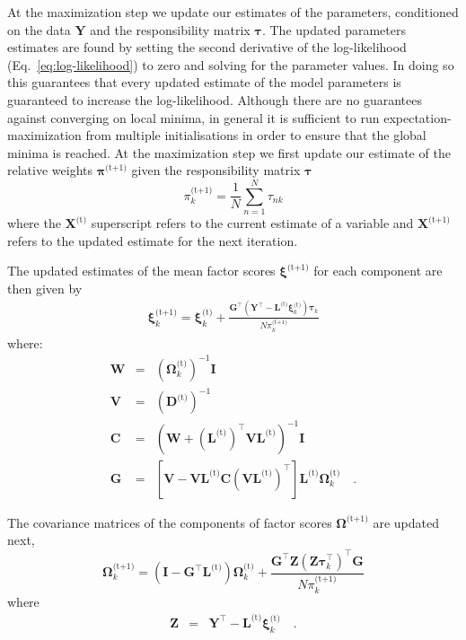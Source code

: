 \documentclass[twocolumn]{aastex62}
\newcommand{\vect}[1]{\boldsymbol{\mathbf{#1}}}
\renewcommand{\vec}[1]{\vect{#1}}
\newcommand{\weight}{\pi}
\newcommand{\data}{\textbf{Y}}
\newcommand{\vecdata}{\vec\data}
\newcommand{\nextstep}{^\textrm{(t+1)}}
\newcommand{\thisstep}{^\textrm{(t)}}
\newcommand{\transpose}{^\intercal}
\newcommand{\eye}{\textbf{I}}
\newcommand{\factorloads}{\textbf{L}}
\newcommand{\specificvariance}{\vec{D}}
\newcommand{\scoremeans}{\vec\xi}
\newcommand{\scorecovs}{\vec\Omega}
\newcommand{\NumData}{N}
\newcommand{\numdata}{n}
\newcommand{\numcomponents}{k}
\begin{document}
At the maximization step we update our estimates of the parameters,
conditioned on the data $\vecdata$ and the responsibility matrix $\vec\tau$.
The updated parameters estimates are found by setting the second derivative
of the log-likelihood (Eq.~\ref{eq:log-likelihood}) to zero and solving for
the parameter values. In doing so this guarantees that every updated
estimate of the model parameters is guaranteed to increase the log-likelihood.
Although there are no guarantees against converging on local minima, in 
general it is sufficient to run expectation-maximization from multiple
initialisations in order to ensure that the global minima is reached.
At the maximization step we first update our estimate of the relative weights 
$\vec\weight\nextstep$ given the responsibility matrix $\vec\tau$
\begin{equation}
	\weight_\numcomponents\nextstep = \frac{1}{\NumData} \sum_{\numdata=1}^{\NumData}\tau_{\numdata\numcomponents}
\end{equation}
\noindent{}where the $\vec{X}\thisstep$ superscript refers to the current estimate of a variable
and $\vec{X}\nextstep$ refers to the updated estimate for the next iteration.


The updated estimates of the mean factor scores 
$\scoremeans\nextstep$ for each component are then given by
\begin{eqnarray}
	\scoremeans_\numcomponents\nextstep = \scoremeans_\numcomponents\thisstep + \frac{\vec{G}\transpose(\vecdata\transpose - \factorloads\thisstep\scoremeans_\numcomponents\thisstep)\vec\tau_\numcomponents}{\NumData\weight_\numcomponents\nextstep}
\end{eqnarray}
\noindent{}where:
\begin{eqnarray}
	\vec{W} &=& (\scorecovs_\numcomponents\thisstep)^{-1}\eye \\
	\vec{V} &=& \left(\specificvariance\thisstep\right)^{-1} \\
	\vec{C} &=& (\vec{W} + (\factorloads\thisstep)\transpose\vec{V}\factorloads\thisstep)^{-1}\eye \\
	\vec{G} &=& \left[\vec{V} - \vec{V}\factorloads\thisstep\vec{C}\left(\vec{V}\factorloads\thisstep\right)\transpose\right]\factorloads\thisstep\scorecovs_k\thisstep \quad .
\end{eqnarray}

The covariance matrices of the components of factor scores $\scorecovs\nextstep$
are updated next,
\begin{equation}
	\scorecovs_\numcomponents\nextstep = \left(\eye - \vec{G}\transpose\factorloads\thisstep\right)\scorecovs_\numcomponents\thisstep + \frac{\vec{G}\transpose\vec{Z}\left(\vec{Z}\vec\tau_\numcomponents\transpose\right)\transpose\vec{G}}{N\weight_\numcomponents\nextstep}
\end{equation}
\noindent{}where
\begin{eqnarray}
	\vec{Z} &=& \vecdata\transpose - \factorloads\thisstep\scoremeans_\numcomponents\thisstep \quad .
\end{eqnarray}
\end{document}
